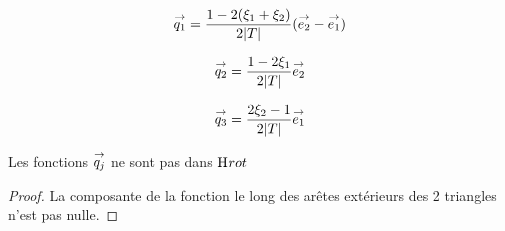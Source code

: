       \begin{minipage}{\textwidth}
        \begin{minipage}{0.329\textwidth}
            \begin{center}
              \begin{tikzpicture}[scale=1]
                
              \end{tikzpicture}
            \end{center}
            \begin{equation*}
              \vect{q_1}=\frac{1-2(\xi_1+\xi_2)}{2|T|}(\vect{e_2}-\vect{e_1})
            \end{equation*}
        \end{minipage}
        \begin{minipage}{0.329\textwidth}
            \begin{center}
              \begin{tikzpicture}[scale=1]
                
              \end{tikzpicture}
               \begin{equation*}
                \vect{q_2}=\frac{1-2\xi_1}{2|T|}\vect{e_2}
              \end{equation*}
            \end{center}
        \end{minipage}
        \begin{minipage}{0.329\textwidth}
            \begin{center}
              \begin{tikzpicture}[scale=1]
                
              \end{tikzpicture}
              \begin{equation*}
                \vect{q_3}=\frac{2\xi_2-1}{2|T|}\vect{e_1}
              \end{equation*}
            \end{center}
        \end{minipage}
        \label{fig:form_int:fon_base:q}
      \end{minipage}

      \begin{prop}
        Les fonctions \(\qj\) ne sont pas dans \(\Hrot\)
      \end{prop}
      \begin{proof}
        La composante de la fonction le long des arêtes extérieurs des 2 triangles n'est pas nulle.
      \end{proof}

